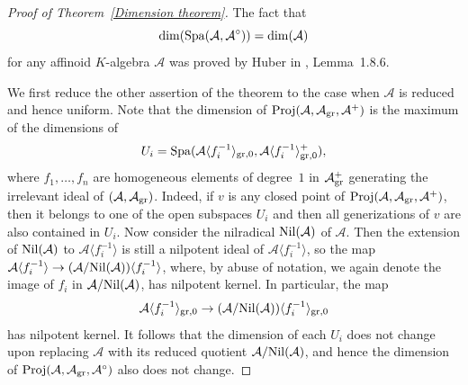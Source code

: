 \documentclass[12pt,twoside,a4paper]{article}
\theoremstyle{definition}
\theoremstyle{remark}
\newcommand\gr{{\rm gr}}
\newcommand\Nil{{\rm Nil}}
\newcommand\Proj{{\rm Proj}}
\newcommand\Spa{{\rm Spa}}
\begin{document}
\begin{proof}[Proof of Theorem~\ref{Dimension theorem}]The fact that \begin{equation*}\dim(\Spa(\mathcal{A}, \mathcal{A}^{\circ}))=\dim(\mathcal{A})\end{equation*}for any affinoid $K$-algebra $\mathcal{A}$ was proved by Huber in \cite{Huber3}, Lemma~1.8.6.

We first reduce the other assertion of the theorem to the case when $\mathcal{A}$ is reduced and hence uniform. Note that the dimension of $\Proj(\mathcal{A}, \mathcal{A}_{\gr}, \mathcal{A}^{+})$ is the maximum of the dimensions of \begin{equation*}U_{i}=\Spa(\mathcal{A}\langle f_{i}^{-1}\rangle_{\gr,0}, \mathcal{A}\langle f_{i}^{-1}\rangle_{\gr,0}^{+}),\end{equation*}where $f_1,\dots, f_n$ are homogeneous elements of degree~$1$ in $\mathcal{A}_{\gr}^{+}$ generating the irrelevant ideal of $(\mathcal{A}, \mathcal{A}_{\gr})$. Indeed, if $v$ is any closed point of $\Proj(\mathcal{A}, \mathcal{A}_{\gr}, \mathcal{A}^{+})$, then it belongs to one of the open subspaces $U_{i}$ and then all generizations of $v$ are also contained in $U_{i}$. Now consider the nilradical $\Nil(\mathcal{A})$ of $\mathcal{A}$. Then the extension of $\Nil(\mathcal{A})$ to $\mathcal{A}\langle f_{i}^{-1}\rangle$ is still a nilpotent ideal of $\mathcal{A}\langle f_{i}^{-1}\rangle$, so the map $\mathcal{A}\langle f_{i}^{-1}\rangle\to (\mathcal{A}/\Nil(\mathcal{A}))\langle f_{i}^{-1}\rangle$, where, by abuse of notation, we again denote the image of $f_{i}$ in $\mathcal{A}/\Nil(\mathcal{A})$, has nilpotent kernel. In particular, the map \begin{equation*}\mathcal{A}\langle f_{i}^{-1}\rangle_{\gr,0}\to (\mathcal{A}/\Nil(\mathcal{A}))\langle f_{i}^{-1}\rangle_{\gr,0}\end{equation*}has nilpotent kernel. It follows that the dimension of each $U_{i}$ does not change upon replacing $\mathcal{A}$ with its reduced quotient $\mathcal{A}/\Nil(\mathcal{A})$, and hence the dimension of $\Proj(\mathcal{A}, \mathcal{A}_{\gr}, \mathcal{A}^{\circ})$ also does not change. 


\end{proof}
\end{document}
